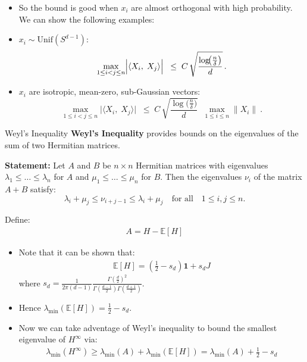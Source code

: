 \documentclass[serif, aspectratio=169]{beamer}
\begin{document}
\begin{frame}
	\begin{itemize}

	\item So the bound is good when \(x_i\) are almost orthogonal with high probability. We can show the following examples:
	
	\item \(x_i \sim \text{Unif}(S^{d-1})\):
	\[
	\max_{1 \le i < j \le n}
	\Bigl|\langle X_i,\;X_j\rangle\Bigr|
	\;\;\le\;
	C\,
	\sqrt{\frac{\log\!\bigl(\tfrac{n}{\delta}\bigr)}{d}}
	\,.
	\]
	
	\item \(x_i\) are isotropic, mean-zero, sub-Gaussian vectors:
	\[
	\max_{1 \le i < j \le n}
	\bigl|\langle X_i,\;X_j\rangle\bigr|
	\;\;\le\;
	C\,
	\sqrt{\frac{\log\!\bigl(\tfrac{n}{\delta}\bigr)}{d}}
	\;\;\max_{1\le i\le n}\|X_i\|\ .
	\]
	\end{itemize}
	
\end{frame}


\begin{frame}{Weyl's Inequality}
    \textbf{Weyl's Inequality} provides bounds on the eigenvalues of the sum of two Hermitian matrices.

    \vspace{0.5cm}
    
    \textbf{Statement:} Let \( A \) and \( B \) be \( n \times n \) Hermitian matrices with eigenvalues \( \lambda_1 \leq \dots \leq \lambda_n \) for \( A \) and \( \mu_1 \leq \dots \leq \mu_n \) for \( B \). Then the eigenvalues \( \nu_i \) of the matrix \( A + B \) satisfy:
    \[
    \lambda_i + \mu_j \leq \nu_{i+j-1} \leq \lambda_i + \mu_j \quad \text{for all} \quad 1 \leq i,j \leq n.
    \]
\end{frame}

\begin{frame}
	Define:
	\begin{align*}
		A = H - \mathbb{E}[H] 
	\end{align*}
	\begin{itemize}
		\item Note that it can be shown that:
		\begin{align*}
			\mathbb{E}[H] = (\frac{1}{2} -s_d) \mathbf{1} + s_d J
		\end{align*}
		where \( s_d = \frac{1}{2 \pi (d - 1)} \frac{\Gamma \left( \frac{d}{2} \right)^2}{\Gamma \left( \frac{d - 1}{2} \right) \Gamma \left( \frac{d + 1}{2} \right)} \). 
		\item Hence \( \lambda_{\min}(\mathbb{E}[H]) = \frac{1}{2} - s_d \).
		\item Now we can take adventage of Weyl's inequality to bound the smallest eigenvalue of \(H^\infty\) via:
			\begin{align*}
				\lambda_{\min}(H^\infty) \geq \lambda_{\min}(A) + \lambda_{\min}(\mathbb{E}[H]) = \lambda_{\min}(A) + \frac{1}{2} - s_d
			\end{align*}
	\end{itemize}
\end{frame}
\end{document}
